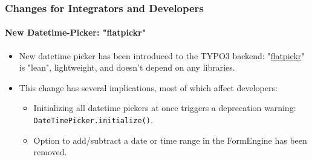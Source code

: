 %

\begin{frame}[fragile]
	\frametitle{Changes for Integrators and Developers}
	\framesubtitle{New Datetime-Picker: "flatpickr"}

	\lstset{basicstyle=\tiny\ttfamily}

	\begin{itemize}
		\item New datetime picker has been introduced to the TYPO3 backend:\newline
			"\href{https://flatpickr.js.org/}{flatpickr}"
			is "lean", lightweight, and doesn't depend on any libraries.
		\item This change has several implications, most of which affect developers:

			\begin{itemize}\small
				\item Initializing all datetime pickers at once triggers a deprecation warning:\newline
					\texttt{DateTimePicker.initialize()}.
				\item Option to add/subtract a date or time range in the FormEngine has been removed.
			\end{itemize}

	\end{itemize}

\end{frame}

